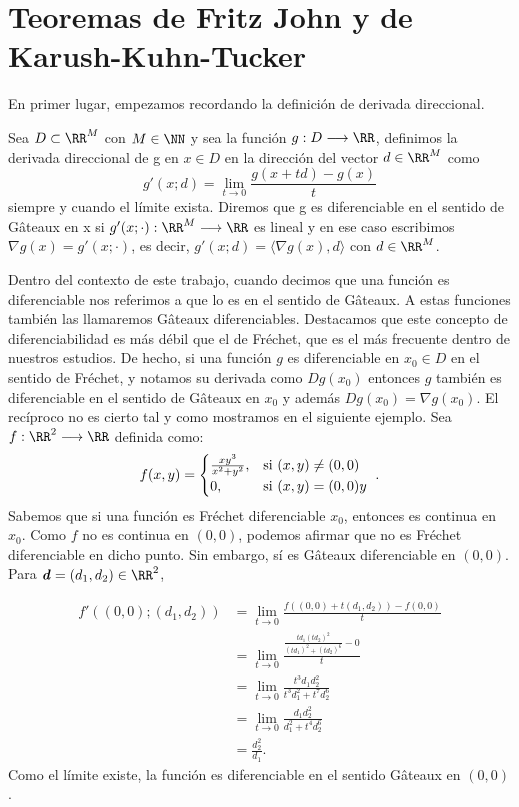 \chapter{Teoremas de Fritz John y de Karush-Kuhn-Tucker}
		\newcommand{\barx}{\bar{x} }
		\newcommand{\dd}{\textbf{\emph{d}}}
		
	En primer lugar, empezamos recordando la definición de derivada direccional. 
	\begin{definicion}
			Sea $ D \subset \RR^M $ con $ M \in \NN $ y sea la función $ g: D \longrightarrow  \RR$, definimos la derivada direccional de g en $ x \in D $ en la dirección del vector $ d\in \RR^M $ como
			\[
			g'(x;d) = \lim_{t\rightarrow0}\frac{g(x+td) - g(x)}{t}
			\]
			siempre y cuando el límite exista. Diremos que g es diferenciable en el sentido de Gâteaux en x si $ g'(x;\cdot):\RR^M \longrightarrow \RR $ es lineal y en ese caso escribimos $ \nabla g(x) = g'(x;\cdot) $, es decir, $ g'(x;d) = \langle \nabla g(x), d\rangle $ con $ d \in \RR^M $.
	\end{definicion}
	
	Dentro del contexto de este trabajo, cuando decimos que una función es diferenciable nos referimos a que lo es en el sentido de Gâteaux. A estas funciones también las llamaremos Gâteaux diferenciables. Destacamos que este concepto de diferenciabilidad es más débil que el de Fréchet, que es el más frecuente dentro de nuestros estudios. De hecho, si una función $ g $ es diferenciable en $ x_0 \in D$ en el sentido de Fréchet, y notamos su derivada como $ Dg(x_0) $ entonces $ g $ también es diferenciable en el sentido de Gâteaux en $ x_0 $ y además $ Dg(x_0) = \nabla g(x_0) $. El recíproco no es cierto tal y como mostramos en el siguiente ejemplo. Sea $ f:\RR^2 \longrightarrow \RR $ definida como:
	\[
	f(x,y) = \begin{cases}
	\frac{xy^3}{x^2+y^2}, & \mbox{si $ (x,y) \neq (0,0) $ } \\
	0, & \mbox{si $ (x,y) = (0,0) y$ }
	\end{cases}.
	\]
	Sabemos que si una función es Fréchet diferenciable $ x_0 $, entonces es continua en $ x_0 $. Como $ f $ no es continua en $ (0,0) $, podemos afirmar que no es Fréchet diferenciable en dicho punto. Sin embargo, sí es Gâteaux diferenciable en $ (0,0) $. Para $ \dd =  (d_1, d_2) \in \RR^2 $,
	
\begin{equation*}
\begin{split}
f'((0,0); (d_1, d_2)) &= \lim_{t\rightarrow0}\frac{f((0,0)+t(d_1, d_2)) - f(0,0)}{t} \\
&= \lim_{t\rightarrow0}\frac{\frac{td_1(td_2)^2}{(td_1)^2+(td_2)^6} - 0}{t} \\
&= \lim_{t\rightarrow0}\frac{t^3d_1d_2^2}{t^3d_1^2+t^7d_2^6} \\
&= \lim_{t\rightarrow0}\frac{d_1d_2^2}{d_1^2+t^4d_2^6} \\
& = \frac{d_2^2}{d_1}.
\end{split}
\end{equation*}
Como el límite existe, la función es diferenciable en el sentido Gâteaux en $ (0,0) $. \\

